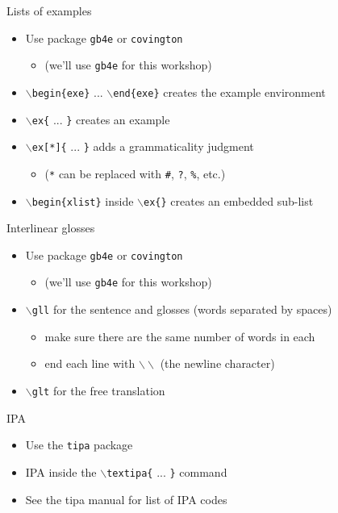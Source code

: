 \documentclass{beamer}
\begin{document}
\begin{frame}{Lists of examples}
	\begin{itemize}
	\pause
	\item Use package \texttt{gb4e} or \texttt{covington}
		\begin{itemize}
		\item (we'll use \texttt{gb4e} for this workshop)
		\end{itemize}
	\pause
	\item \texttt{$\backslash$begin\{exe\}} ... \texttt{$\backslash$end\{exe\}} creates the example environment
	\pause
	\item \texttt{$\backslash$ex\{} ... \texttt{\}} creates an example
	\pause
	\item \texttt{$\backslash$ex[*]\{} ... \texttt{\}} adds a grammaticality judgment
		\begin{itemize}
		\item (\texttt{*} can be replaced with \texttt{\#}, \texttt{?}, \texttt{\%}, etc.)
		\end{itemize}
	\pause
	\item \texttt{$\backslash$begin\{xlist\}} inside \texttt{$\backslash$ex\{\}} creates an embedded sub-list
	\end{itemize}
\end{frame}

\begin{frame}{Interlinear glosses}
	\begin{itemize}
	\pause
	\item Use package \texttt{gb4e} or \texttt{covington}
		\begin{itemize}
		\item (we'll use \texttt{gb4e} for this workshop)
		\end{itemize}
	\pause
	\item \texttt{$\backslash$gll} for the sentence and glosses (words separated by spaces)
		\begin{itemize}
		\item make sure there are the same number of words in each
		\item end each line with $\backslash\backslash$ (the newline character)
		\end{itemize}
	\pause
	\item \texttt{$\backslash$glt} for the free translation
	\end{itemize}
\end{frame}


\begin{frame}{IPA}
	\begin{itemize}
	\pause
	\item Use the \texttt{tipa} package
	\pause
	\item IPA inside the \texttt{$\backslash$textipa\{} ... \texttt{\}} command
	\pause
	\item See the tipa manual for list of IPA codes
	\end{itemize}
\end{frame}
\end{document}
